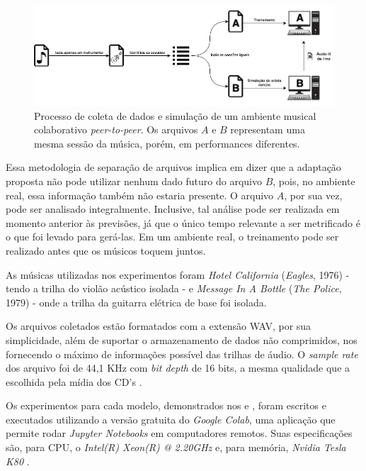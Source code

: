 \begin{figure}[htbp]
\centering
\includegraphics[width=1\textwidth]{images/data-gathering.png}
\caption{Processo de coleta de dados e simulação de um ambiente musical colaborativo \textit{peer-to-peer}. Os arquivos $A$ e $B$ representam uma mesma sessão da música, porém, em performances diferentes.}
\label{fig:data_gathering}
\end{figure}

Essa metodologia de separação de arquivos implica em dizer que a adaptação proposta não pode utilizar nenhum dado futuro do arquivo $B$, pois, no ambiente real, essa informação também não estaria presente. O arquivo $A$, por sua vez, pode ser analisado integralmente. Inclusive, tal análise pode ser realizada em momento anterior às previsões, já que o único tempo relevante a ser metrificado é o que foi levado para gerá-las. Em um ambiente real, o treinamento pode ser realizado antes que os músicos toquem juntos.

As músicas utilizadas nos experimentos foram \textit{Hotel California} (\textit{Eagles}, 1976) - tendo a trilha do violão acústico isolada - e \textit{Message In A Bottle} (\textit{The Police}, 1979) - onde a trilha da guitarra elétrica de base foi isolada.

Os arquivos coletados estão formatados com a extensão WAV, por sua simplicidade, além de suportar o armazenamento de dados não comprimidos, nos fornecendo o máximo de informações possível das trilhas de áudio. O \textit{sample rate} dos arquivo foi de 44,1 KHz com \textit{bit depth} de 16 bits, a mesma qualidade que a escolhida pela mídia dos CD's \cite{cd_quality}.

Os experimentos para cada modelo, demonstrados nos  e , foram escritos e executados utilizando a versão gratuita do \textit{Google Colab}, uma aplicação que permite rodar \textit{Jupyter Notebooks} em computadores remotos. Suas especificações são, para CPU, o \textit{Intel(R) Xeon(R) @ 2.20GHz} e, para memória, \textit{Nvidia Tesla K80} \cite{colab_specs}.